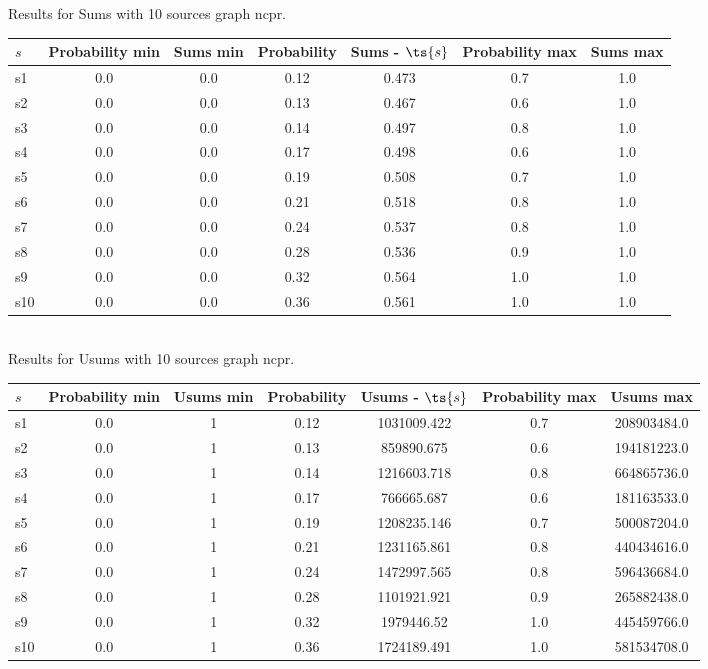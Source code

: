 \documentclass{article}
\begin{document}
\noindent Results for Sums with 10 sources graph ncpr.

\noindent\begin{tabular}{|l|c|c|c|c|c|c|}
\hline
$s$& Probability min & Sums min & Probability & Sums - $\ts{s}$ & Probability max & Sums max\\
\hline
s1 &0.0 & 0.0 & 0.12 & 0.473 & 0.7 & 1.0\\
\hline
s2 &0.0 & 0.0 & 0.13 & 0.467 & 0.6 & 1.0\\
\hline
s3 &0.0 & 0.0 & 0.14 & 0.497 & 0.8 & 1.0\\
\hline
s4 &0.0 & 0.0 & 0.17 & 0.498 & 0.6 & 1.0\\
\hline
s5 &0.0 & 0.0 & 0.19 & 0.508 & 0.7 & 1.0\\
\hline
s6 &0.0 & 0.0 & 0.21 & 0.518 & 0.8 & 1.0\\
\hline
s7 &0.0 & 0.0 & 0.24 & 0.537 & 0.8 & 1.0\\
\hline
s8 &0.0 & 0.0 & 0.28 & 0.536 & 0.9 & 1.0\\
\hline
s9 &0.0 & 0.0 & 0.32 & 0.564 & 1.0 & 1.0\\
\hline
s10 &0.0 & 0.0 & 0.36 & 0.561 & 1.0 & 1.0\\
\hline
\end{tabular}\\

\noindent Results for Usums with 10 sources graph ncpr.

\noindent\begin{tabular}{|l|c|c|c|c|c|c|}
\hline
$s$& Probability min & Usums min & Probability & Usums - $\ts{s}$ & Probability max & Usums max\\
\hline
s1 &0.0 & 1 & 0.12 & 1031009.422 & 0.7 & 208903484.0\\
\hline
s2 &0.0 & 1 & 0.13 & 859890.675 & 0.6 & 194181223.0\\
\hline
s3 &0.0 & 1 & 0.14 & 1216603.718 & 0.8 & 664865736.0\\
\hline
s4 &0.0 & 1 & 0.17 & 766665.687 & 0.6 & 181163533.0\\
\hline
s5 &0.0 & 1 & 0.19 & 1208235.146 & 0.7 & 500087204.0\\
\hline
s6 &0.0 & 1 & 0.21 & 1231165.861 & 0.8 & 440434616.0\\
\hline
s7 &0.0 & 1 & 0.24 & 1472997.565 & 0.8 & 596436684.0\\
\hline
s8 &0.0 & 1 & 0.28 & 1101921.921 & 0.9 & 265882438.0\\
\hline
s9 &0.0 & 1 & 0.32 & 1979446.52 & 1.0 & 445459766.0\\
\hline
s10 &0.0 & 1 & 0.36 & 1724189.491 & 1.0 & 581534708.0\\
\hline
\end{tabular}\\
\end{document}
